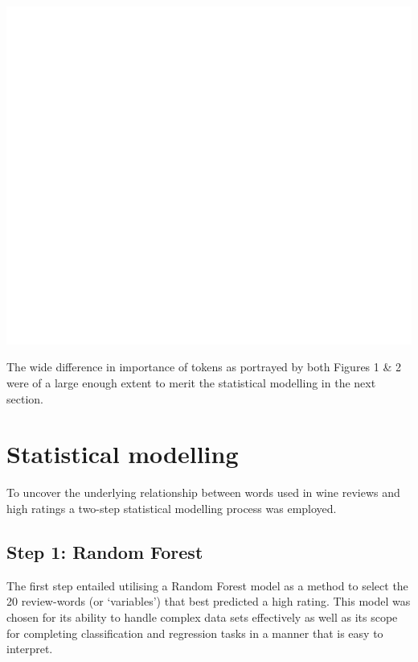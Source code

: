 \documentclass[11pt,preprint]{elsarticle}
\let\origfigure\figure
\let\endorigfigure\endfigure
\renewenvironment{figure}[1][2] {
    \expandafter\origfigure\expandafter[H]
} {
    \endorigfigure
}
\numberwithin{equation}{section}
\numberwithin{figure}{section}
\numberwithin{table}{section}
\begin{document}
\begin{figure}[H]

{\centering \includegraphics[width=0.8\linewidth]{writeup/fig2} 

}

\caption{Word cloud of popular words in reviews based on popularity index}\label{fig:fig2}
\end{figure}

The wide difference in importance of tokens as portrayed by both Figures
1 \& 2 were of a large enough extent to merit the statistical modelling
in the next section.

\newpage

\section{Statistical modelling}\label{statistical-modelling}

\label{StatMod} To uncover the underlying relationship between words
used in wine reviews and high ratings a two-step statistical modelling
process was employed.

\subsection{Step 1: Random Forest}\label{step-1-random-forest}

The first step entailed utilising a Random Forest model as a method to
select the 20 review-words (or `variables') that best predicted a high
rating. This model was chosen for its ability to handle complex data
sets effectively as well as its scope for completing classification and
regression tasks in a manner that is easy to interpret.
\end{document}

